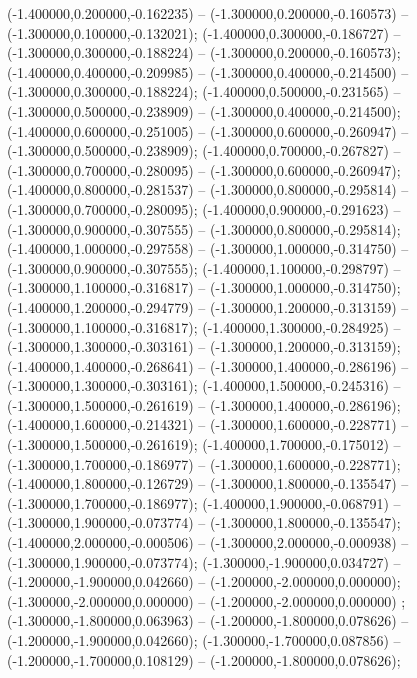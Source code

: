  (-1.400000,0.200000,-0.162235) -- (-1.300000,0.200000,-0.160573) -- (-1.300000,0.100000,-0.132021);
 (-1.400000,0.300000,-0.186727) -- (-1.300000,0.300000,-0.188224) -- (-1.300000,0.200000,-0.160573);
 (-1.400000,0.400000,-0.209985) -- (-1.300000,0.400000,-0.214500) -- (-1.300000,0.300000,-0.188224);
 (-1.400000,0.500000,-0.231565) -- (-1.300000,0.500000,-0.238909) -- (-1.300000,0.400000,-0.214500);
 (-1.400000,0.600000,-0.251005) -- (-1.300000,0.600000,-0.260947) -- (-1.300000,0.500000,-0.238909);
 (-1.400000,0.700000,-0.267827) -- (-1.300000,0.700000,-0.280095) -- (-1.300000,0.600000,-0.260947);
 (-1.400000,0.800000,-0.281537) -- (-1.300000,0.800000,-0.295814) -- (-1.300000,0.700000,-0.280095);
 (-1.400000,0.900000,-0.291623) -- (-1.300000,0.900000,-0.307555) -- (-1.300000,0.800000,-0.295814);
 (-1.400000,1.000000,-0.297558) -- (-1.300000,1.000000,-0.314750) -- (-1.300000,0.900000,-0.307555);
 (-1.400000,1.100000,-0.298797) -- (-1.300000,1.100000,-0.316817) -- (-1.300000,1.000000,-0.314750);
 (-1.400000,1.200000,-0.294779) -- (-1.300000,1.200000,-0.313159) -- (-1.300000,1.100000,-0.316817);
 (-1.400000,1.300000,-0.284925) -- (-1.300000,1.300000,-0.303161) -- (-1.300000,1.200000,-0.313159);
 (-1.400000,1.400000,-0.268641) -- (-1.300000,1.400000,-0.286196) -- (-1.300000,1.300000,-0.303161);
 (-1.400000,1.500000,-0.245316) -- (-1.300000,1.500000,-0.261619) -- (-1.300000,1.400000,-0.286196);
 (-1.400000,1.600000,-0.214321) -- (-1.300000,1.600000,-0.228771) -- (-1.300000,1.500000,-0.261619);
 (-1.400000,1.700000,-0.175012) -- (-1.300000,1.700000,-0.186977) -- (-1.300000,1.600000,-0.228771);
 (-1.400000,1.800000,-0.126729) -- (-1.300000,1.800000,-0.135547) -- (-1.300000,1.700000,-0.186977);
 (-1.400000,1.900000,-0.068791) -- (-1.300000,1.900000,-0.073774) -- (-1.300000,1.800000,-0.135547);
 (-1.400000,2.000000,-0.000506) -- (-1.300000,2.000000,-0.000938) -- (-1.300000,1.900000,-0.073774);
 (-1.300000,-1.900000,0.034727) -- (-1.200000,-1.900000,0.042660) -- (-1.200000,-2.000000,0.000000);
 (-1.300000,-2.000000,0.000000) -- (-1.200000,-2.000000,0.000000) ;
 (-1.300000,-1.800000,0.063963) -- (-1.200000,-1.800000,0.078626) -- (-1.200000,-1.900000,0.042660);
 (-1.300000,-1.700000,0.087856) -- (-1.200000,-1.700000,0.108129) -- (-1.200000,-1.800000,0.078626);
